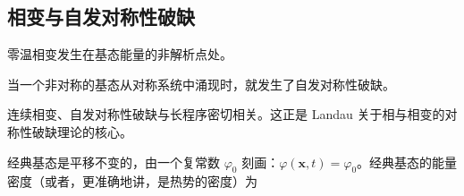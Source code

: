 \subsection{相变与自发对称性破缺}

\begin{keypoints}
\item 零温相变发生在基态能量的非解析点处。
\item 当一个非对称的基态从对称系统中涌现时，就发生了自发对称性破缺。
\item 连续相变、自发对称性破缺与长程序密切相关。这正是 Landau 关于相与相变的对称性破缺理论的核心。
\end{keypoints}

经典基态是平移不变的，由一个复常数 $\varphi_0$ 刻画：$\varphi(\pmb{x},t)=\varphi_0$。经典基态的能量密度（或者，更准确地讲，是热势的密度）为

